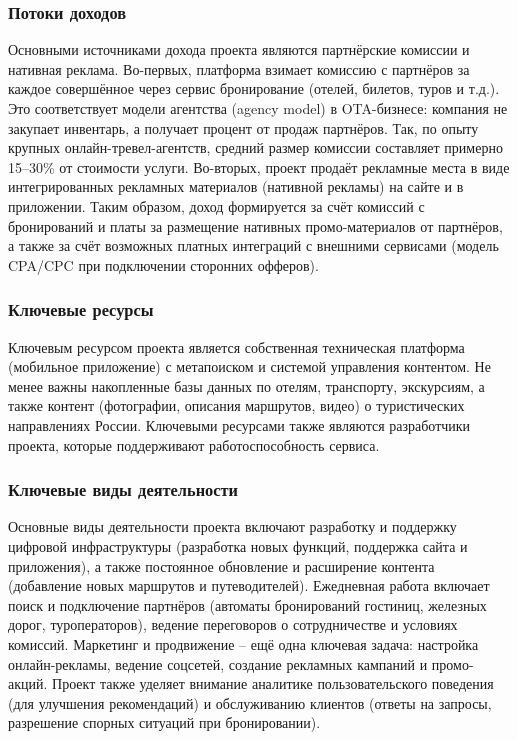 \subsubsection*{Потоки доходов}
Основными источниками дохода проекта являются партнёрские комиссии и нативная реклама. Во-первых, платформа взимает комиссию с партнёров за каждое совершённое через сервис бронирование (отелей, билетов, туров и т.д.). Это соответствует модели агентства (agency model) в OTA-бизнесе: компания не закупает инвентарь, а получает процент от продаж партнёров. Так, по опыту крупных онлайн-тревел-агентств, средний размер комиссии составляет примерно 15–30\% от стоимости услуги. Во-вторых, проект продаёт рекламные места в виде интегрированных рекламных материалов (нативной рекламы) на сайте и в приложении. Таким образом, доход формируется за счёт комиссий с бронирований и платы за размещение нативных промо-материалов от партнёров, а также за счёт возможных платных интеграций с внешними сервисами (модель CPA/CPC при подключении сторонних офферов).

\subsubsection*{Ключевые ресурсы}
Ключевым ресурсом проекта является собственная техническая платформа (мобильное приложение) с метапоиском и системой управления контентом. Не менее важны накопленные базы данных по отелям, транспорту, экскурсиям, а также контент (фотографии, описания маршрутов, видео) о туристических направлениях России. Ключевыми ресурсами также являются разработчики проекта, которые поддерживают работоспособность сервиса.

\subsubsection*{Ключевые виды деятельности}
Основные виды деятельности проекта включают разработку и поддержку цифровой инфраструктуры (разработка новых функций, поддержка сайта и приложения), а также постоянное обновление и расширение контента (добавление новых маршрутов и путеводителей). Ежедневная работа включает поиск и подключение партнёров (автоматы бронирований гостиниц, железных дорог, туроператоров), ведение переговоров о сотрудничестве и условиях комиссий. Маркетинг и продвижение – ещё одна ключевая задача: настройка онлайн-рекламы, ведение соцсетей, создание рекламных кампаний и промо-акций. Проект также уделяет внимание аналитике пользовательского поведения (для улучшения рекомендаций) и обслуживанию клиентов (ответы на запросы, разрешение спорных ситуаций при бронировании).

